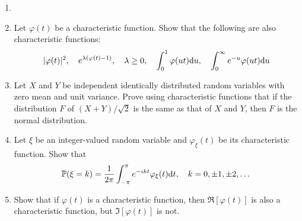 \begin{exercise}
\begin{enumerate}
    \item[]
    \item Let $\varphi(t)$ be a characteristic function. Show that the following are also characteristic functions:
    \begin{equation*}
        |\varphi(t)|^2, \quad e^{\lambda(\varphi(t) - 1)}, \quad \lambda \ge 0, \quad \int_0^1 \varphi(u t) \mathrm{d} u, \quad  \int_0^\infty e^{-u} \varphi(u t) \mathrm{d} u
    \end{equation*}
    \item Let $X$ and $Y$ be independent identically distributed random variables with zero mean and unit variance. Prove using characteristic functions that if the distribution $F$ of $(X+Y)/\sqrt{2}$ is the same as that of $X$ and $Y$, then $F$ is the normal distribution.
    \item Let $\xi$ be an integer-valued random variable and $\varphi_\xi(t)$ be its characteristic function. Show that
    \begin{equation*}
        \mathbb{P}(\xi = k) = \frac{1}{2\pi} \int_{-\pi}^\pi e^{-ikt} \varphi_\xi(t) \mathrm{d} t, \quad k = 0, \pm 1, \pm 2, \dots
    \end{equation*}
    \item Show that if $\varphi(t)$ is a characteristic function, then $\Re[\varphi(t)]$ is also a characteristic function, but $\Im[\varphi(t)]$ is not.
\end{enumerate}
\end{exercise}
\newpage